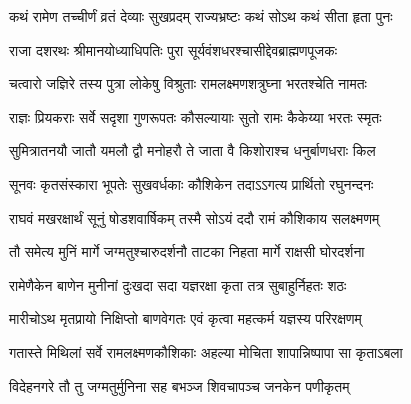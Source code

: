 
\translink{}

\storymeta





\twolineshloka
{कथं रामेण तच्चीर्णं व्रतं देव्याः सुखप्रदम्}
{राज्यभ्रष्टः कथं सोऽथ कथं सीता हृता पुनः}%



\twolineshloka
{राजा दशरथः श्रीमानयोध्याधिपतिः पुरा}
{सूर्यवंशधरश्चासीद्देवब्राह्मणपूजकः}%

\twolineshloka
{चत्वारो जज्ञिरे तस्य पुत्रा लोकेषु विश्रुताः}
{रामलक्ष्मणशत्रुघ्ना भरतश्चेति नामतः}%

\twolineshloka
{राज्ञः प्रियकराः सर्वे सदृशा गुणरूपतः}
{कौसल्यायाः सुतो रामः कैकेय्या भरतः स्मृतः}%

\twolineshloka
{सुमित्रातनयौ जातौ यमलौ द्वौ मनोहरौ}
{ते जाता वै किशोराश्च धनुर्बाणधराः किल}%

\twolineshloka
{सूनवः कृतसंस्कारा भूपतेः सुखवर्धकाः}
{कौशिकेन तदाऽऽगत्य प्रार्थितो रघुनन्दनः}%

\twolineshloka
{राघवं मखरक्षार्थं सूनुं षोडशवार्षिकम्}
{तस्मै सोऽयं ददौ रामं कौशिकाय सलक्ष्मणम्}%

\twolineshloka
{तौ समेत्य मुनिं मार्गे जग्मतुश्चारुदर्शनौ}
{ताटका निहता मार्गे राक्षसी घोरदर्शना}%

\twolineshloka
{रामेणैकेन बाणेन मुनीनां दुःखदा सदा}
{यज्ञरक्षा कृता तत्र सुबाहुर्निहतः शठः}%

\twolineshloka
{मारीचोऽथ मृतप्रायो निक्षिप्तो बाणवेगतः}
{एवं कृत्वा महत्कर्म यज्ञस्य परिरक्षणम्}%

\twolineshloka
{गतास्ते मिथिलां सर्वे रामलक्ष्मणकौशिकाः}
{अहल्या मोचिता शापान्निष्पापा सा कृताऽबला}%

\twolineshloka
{विदेहनगरे तौ तु जग्मतुर्मुनिना सह}
{बभञ्ज शिवचापञ्च जनकेन पणीकृतम्}%

